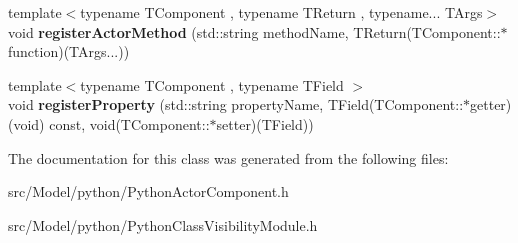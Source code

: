 \begin{DoxyCompactItemize}
\item 
{\footnotesize template$<$typename T\+Component , typename T\+Return , typename... T\+Args$>$ }\\void {\bfseries register\+Actor\+Method} (std\+::string method\+Name, T\+Return(T\+Component\+::$\ast$function)(T\+Args...))\hypertarget{classPythonClassVisibilityModule_a9c100ca2b2947428299a57cd9eaf5f58}{}\label{classPythonClassVisibilityModule_a9c100ca2b2947428299a57cd9eaf5f58}

\item 
{\footnotesize template$<$typename T\+Component , typename T\+Field $>$ }\\void {\bfseries register\+Property} (std\+::string property\+Name, T\+Field(T\+Component\+::$\ast$getter)(void) const, void(T\+Component\+::$\ast$setter)(T\+Field))\hypertarget{classPythonClassVisibilityModule_a12523e96d00705f43bb9ffef1c7091e4}{}\label{classPythonClassVisibilityModule_a12523e96d00705f43bb9ffef1c7091e4}

\end{DoxyCompactItemize}


The documentation for this class was generated from the following files\+:\begin{DoxyCompactItemize}
\item 
src/\+Model/python/Python\+Actor\+Component.\+h\item 
src/\+Model/python/Python\+Class\+Visibility\+Module.\+h\end{DoxyCompactItemize}
